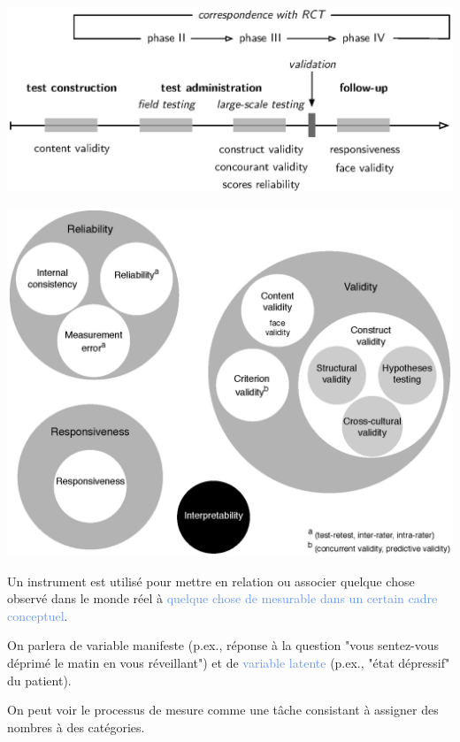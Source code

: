 
{\centering \includegraphics[width=.8\textwidth]{figs/testing.eps}\par}


{\centering \includegraphics[width=.5\textwidth]{figs/cosmin_taxonomy.eps}\par}



Un instrument est utilisé pour mettre en relation ou associer
\textcolor{Apricot}{quelque chose observé dans le monde réel} à
\textcolor{CornflowerBlue}{quelque chose de mesurable dans un certain cadre
  conceptuel}.

On parlera de \textcolor{Apricot}{variable manifeste} (p.ex., réponse à la
question "vous sentez-vous déprimé le matin en vous réveillant") et de
\textcolor{CornflowerBlue}{variable latente} (p.ex., "état dépressif" du
patient). 

On peut voir le processus de mesure comme une tâche consistant à assigner des
nombres à des catégories\autocite{Stevens1946,DeBoeck2005}.



